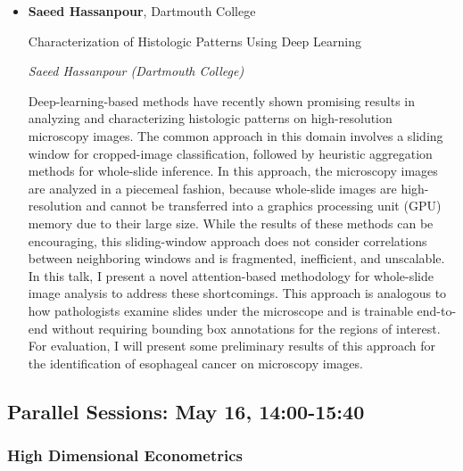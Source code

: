 \begin{itemize}
\item \textbf{Saeed Hassanpour}, Dartmouth College

Characterization of Histologic Patterns Using Deep Learning

\emph{\footnotesize Saeed Hassanpour (Dartmouth College)}

Deep-learning-based methods have recently shown promising results in analyzing and characterizing histologic patterns on high-resolution microscopy images. The common approach in this domain involves a sliding window for cropped-image classification, followed by heuristic aggregation methods for whole-slide inference. In this approach, the microscopy images are analyzed in a piecemeal fashion, because whole-slide images are high-resolution and cannot be transferred into a graphics processing unit (GPU) memory due to their large size. While the results of these methods can be encouraging, this sliding-window approach does not consider correlations between neighboring windows and is fragmented, inefficient, and unscalable. In this talk, I present a novel attention-based methodology for whole-slide image analysis to address these shortcomings. This approach is analogous to how pathologists examine slides under the microscope and is trainable end-to-end without requiring bounding box annotations for the regions of interest. For evaluation, I will present some preliminary results of this approach for the identification of esophageal cancer on microscopy images.

\end{itemize}

\subsection*{Parallel Sessions: May 16, 14:00-15:40}

\subsubsection*{High Dimensional Econometrics}

